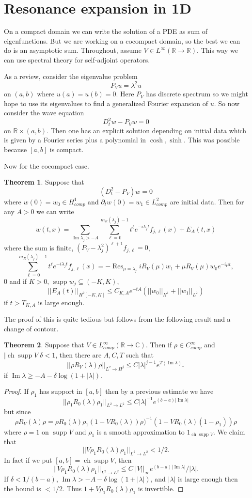\documentclass[12pt]{report}
\newcommand{\RR}{\mathbb{R}}
\newcommand{\CC}{\mathbb{C}}
\newcommand{\ch}{\operatorname{ch}}
\newcommand{\Res}{\operatorname{Res}}
\newcommand{\supp}{\operatorname{supp}}
\renewcommand{\Im}{\operatorname{Im}}
\theoremstyle{definition}
\newtheorem{theorem}{Theorem}[chapter]
\begin{document}
\section{Resonance expansion in 1D}
On a compact domain we can write the solution of a PDE as sum of eigenfunctions.
But we are working on a cocompact domain, so the best we can do is an asymptotic sum.
Throughout, assume $V \in L^\infty(\RR \to \RR)$. This way we can use spectral theory for self-adjoint operators.

As a review, consider the eigenvalue problem
$$P_Vu = \lambda^2u$$
on $(a, b)$ where $u(a) = u(b) = 0$.
Here $P_V$ has discrete spectrum so we might hope to use its eigenvalues to find a generalized Fourier expansion of $u$.
So now consider the wave equation
$$D_t^2w - P_Vw = 0$$
on $\RR \times (a, b)$. Then one has an explicit solution depending on initial data which is given by a Fourier series plus a polynomial in $\cosh,\sinh$. This was possible because $[a, b]$ is compact.

Now for the cocompact case.
\begin{theorem}
Suppose that
$$(D_t^2 - P_V)w = 0$$
where $w(0) = w_0 \in H^1_{comp}$ and $\partial_tw(0) = w_1 \in L^2_{comp}$ are initial data.
Then for any $A > 0$ we can write
$$w(t, x) = \sum_{\Im \lambda_j > -A} \sum_{\ell=0}^{m_R(\lambda_j) - 1} t^\ell e^{-i\lambda_jt}f_{j,\ell}(x) + E_A(t, x)$$
where the sum is finite, $(P_V - \lambda_j^2)^{\ell + 1}f_{j,\ell} = 0$,
$$\sum_{\ell=0}^{m_R(\lambda_j) - 1} t^\ell e^{-i\lambda_jt}f_{j,\ell}(x) = -\Res_{\mu=\lambda_j} iR_V(\mu)w_1 + \mu R_V(\mu)w_0e^{-i\mu t},$$0
and if $K > 0$, $\supp w_j \subseteq (-K, K)$,
$$||E_A(t)||_{H^2[-K, K]} \leq C_{K,A} e^{-tA}(||w_0||_{H^1} + ||w_1||_{L^2})$$
if $t > T_{K,A}$ is large enough.
\end{theorem}
The proof of this is quite tedious but follows from the following result and a change of contour.
\begin{theorem}
Suppose that $V \in L^\infty_{comp}(\RR \to \CC)$. Then if $\rho \in C^\infty_{comp}$ and $|\ch\supp V| \delta < 1$, then there are $A,C,T$ such that
$$||\rho R_V(\lambda) \rho||_{L^2 \to H^j} \leq C|\lambda|^{j-1}e^{T(\Im \lambda)_-}$$
if $\Im \lambda \geq -A -\delta \log(1 + |\lambda|)$.
\end{theorem}
\begin{proof}
If $\rho_1$ has support in $[a, b]$ then by a previous estimate we have
$$||\rho_1 R_0(\lambda) \rho_1||_{L^2 \to L^2} \leq C|\lambda|^{-1}e^{(b-a)|\Im \lambda|}$$
but since
$$\rho R_V(\lambda) \rho = \rho R_0(\lambda) \rho_1 (1 + VR_0(\lambda))\rho)^{-1} (1 - VR_0(\lambda)(1 - \rho_1))\rho$$
where $\rho = 1$ on $\supp V$ and $\rho_1$ is a smooth approximation to $1_{\ch \supp V}$.
We claim that
$$||V \rho_1 R_0(\lambda) \rho_1||_{L^2 \to L^2} < 1/2.$$
In fact if we put $[a, b] = \ch \supp V$, then
$$||V \rho_1 R_0(\lambda) \rho_1||_{L^2 \to L^2} \leq C||V||_\infty e^{(b-a)|\Im \lambda|}/|\lambda|.$$
If $\delta < 1/(b-a)$, $\Im \lambda > -A -\delta \log(1 + |\lambda|)$, and $|\lambda|$ is large enough then the bound is $< 1/2$.
Thus $1 + V \rho_1 R_0(\lambda) \rho_1$ is invertible.
\end{proof}
\end{document}
